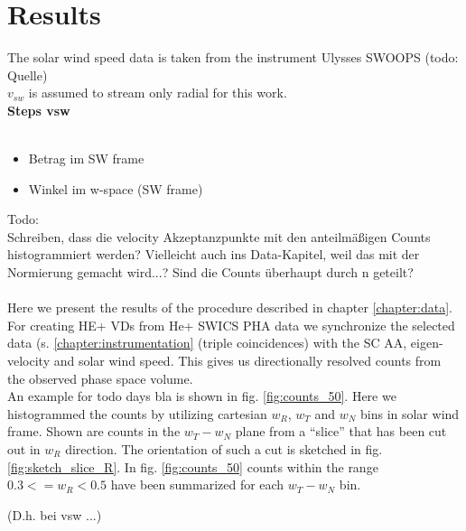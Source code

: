 
\chapter{Results} %

\label{chap:results} %
The solar wind speed data is taken from the instrument Ulysses SWOOPS (todo: Quelle)\\
$v_{sw}$ is assumed to stream only radial for this work.\\
\textbf{Steps vsw} \\ \\

\begin{itemize}
	\item Betrag im SW frame
	\item Winkel im w-space (SW frame)
\end{itemize}

\clearpage
%
%
%
Todo:\\
Schreiben, dass die velocity Akzeptanzpunkte mit den anteilmäßigen Counts histogrammiert werden? Vielleicht auch ins Data-Kapitel, weil das mit der Normierung gemacht wird...? Sind die Counts überhaupt durch n geteilt?
\\ \\
Here we present the results of the procedure described in chapter \ref{chapter:data}. For creating HE+ VDs from He+ SWICS PHA data we synchronize the selected data (s. \ref{chapter:instrumentation} (triple coincidences) with the SC AA, eigen-velocity and solar wind speed.
This gives us directionally resolved counts from the observed phase space volume.
\\
An example for todo days bla is shown in fig. \ref{fig:counts_50}. Here we histogrammed the counts by utilizing cartesian $w_R$, $w_T$ and $w_N$ bins in solar wind frame. Shown are counts in the $w_T - w_N$ plane from a ``slice'' that has been cut out in $w_R$ direction. The orientation of such a cut is sketched in fig. \ref{fig:sketch_slice_R}. In fig. \ref{fig:counts_50} counts within the range $0.3 <= w_R < 0.5$ have been summarized for each $w_T - w_N$ bin.

(D.h. bei vsw ...)



